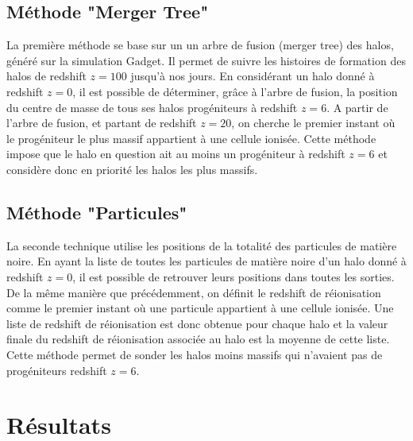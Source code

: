 

\subsection{Méthode "Merger Tree"}
La première méthode se base sur un un arbre de fusion (merger tree) des halos, généré sur la simulation Gadget.
Il permet de suivre les histoires de formation des halos de redshift $z=100$ jusqu'à nos jours.
En considérant un halo donné à redshift $z=0$, il est possible de déterminer, grâce à l'arbre de fusion, la position du centre de masse de tous ses halos progéniteurs à redshift $z=6$.
A partir de l'arbre de fusion, et partant de redshift $z=20$, on cherche le premier instant où le progéniteur le plus massif appartient à une cellule ionisée.
Cette méthode impose que le halo en question ait au moins un progéniteur à redshift $z=6$ et considère donc en priorité les halos les plus massifs.

\subsection{Méthode "Particules"}
La seconde technique utilise les positions de la totalité des particules de matière noire.
En ayant la liste de toutes les particules de matière noire d'un halo donné à redshift $z=0$, il est possible de retrouver leurs positions dans toutes les sorties.
De la même manière que précédemment, on définit le redshift de réionisation comme le premier instant où une particule appartient à une cellule ionisée.
Une liste de redshift de réionisation est donc obtenue pour chaque halo et la valeur finale du redshift de réionisation associée au halo est la moyenne de cette liste.
Cette méthode permet de sonder les halos moins massifs qui n'avaient pas de progéniteurs redshift $z=6$.

\section{Résultats}

